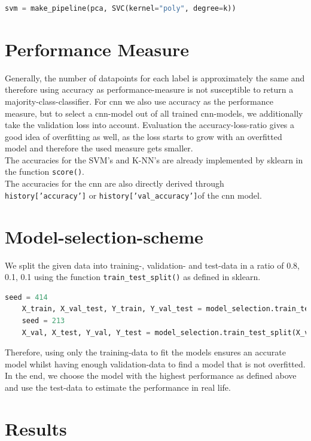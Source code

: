 \documentclass[12pt,a4paper]{scrartcl}		%
\begin{document}
\begin{lstlisting}[language=Python]
    svm = make_pipeline(pca, SVC(kernel="poly", degree=k))
\end{lstlisting}

\section{Performance Measure}
    Generally, the number of datapoints for each label is approximately the same and therefore using accuracy as performance-measure is not susceptible to return a majority-class-classifier. 
    For cnn we also use accuracy as the performance measure, but to select a cnn-model out of all trained cnn-models, we additionally take the validation 
    loss into account. Evaluation the accuracy-loss-ratio gives a good idea of overfitting as well, as the loss starts to grow with an overfitted model and therefore 
    the used measure gets smaller. \\ 
    The accuracies for the SVM’s and K-NN’s are already implemented by sklearn in the function \texttt{score()}.\\
    The accuracies for the cnn are also directly derived through \texttt{history['accuracy']} or \texttt{history['val\_accuracy']}of the cnn model.


\section{Model-selection-scheme}
    We split the given data into training-, validation- and test-data in a ratio of 0.8, 0.1, 0.1 using the function \texttt{train\_test\_split()} as defined in sklearn. 
\begin{lstlisting}[language=Python]
    seed = 414
    X_train, X_val_test, Y_train, Y_val_test = model_selection.train_test_split(X,Y, test_size = 0.2, shuffle=True, random_state=seed)
    seed = 213
    X_val, X_test, Y_val, Y_test = model_selection.train_test_split(X_val_test,Y_val_test, test_size = 0.5, shuffle=True, random_state=seed)
\end{lstlisting}
    Therefore, using only the training-data to fit the models ensures an accurate model whilst having enough validation-data to find a model that is not overfitted. In the end, we choose the model with the highest performance as defined above and use the test-data to estimate the performance in real life. 

\section{Results}
\end{document}
